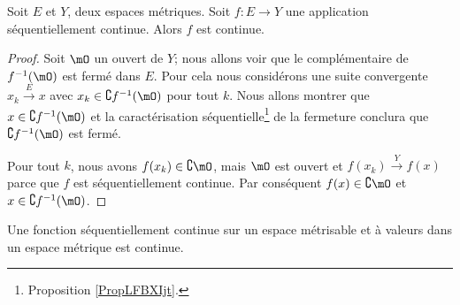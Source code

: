 \begin{proposition} \label{PropXIAQSXr}
    Soit \( E\) et \( Y\), deux espaces métriques. Soit \( f\colon E\to Y\) une application séquentiellement continue. Alors \( f\) est continue.
\end{proposition}

\begin{proof}
    Soit \( \mO\) un ouvert de \( Y\); nous allons voir que le complémentaire de \( f^{-1}(\mO)\) est fermé dans \( E\). Pour cela nous considérons une suite convergente \( x_k\stackrel{E}{\longrightarrow} x\) avec \( x_k\in\complement f^{-1}(\mO)\) pour tout \( k\). Nous allons montrer que \( x\in \complement f^{-1}(\mO)\) et la caractérisation séquentielle\footnote{Proposition \ref{PropLFBXIjt}.} de la fermeture conclura que \( \complement f^{-1}(\mO)\) est fermé.

    Pour tout \( k\), nous avons \( f(x_k)\in\complement \mO\), mais \( \mO\) est ouvert et \( f(x_k)\stackrel{Y}{\longrightarrow}f(x)\) parce que \( f\) est séquentiellement continue. Par conséquent \( f(x)\in\complement \mO\) et \( x\in\complement f^{-1}(\mO)\).
\end{proof}


\begin{proposition}
    Une fonction séquentiellement continue sur un espace métrisable et à valeurs dans un espace métrique est continue.
\end{proposition}

